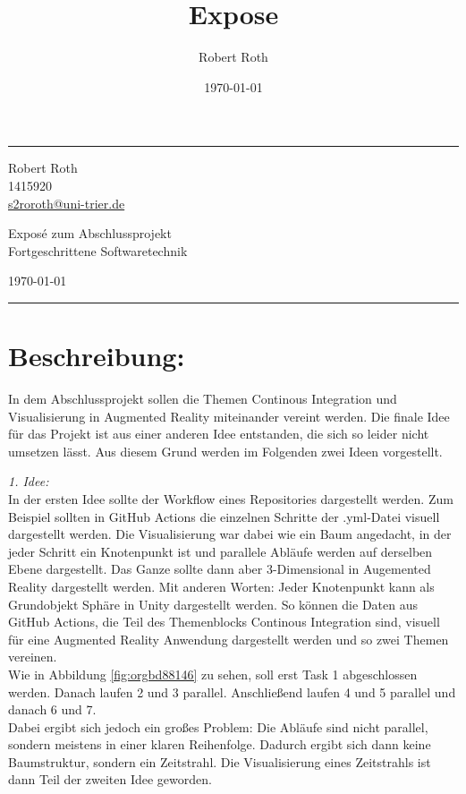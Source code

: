 \documentclass{article}
\author{Robert Roth}
\date{\today}
\title{Expose}
\makeatletter
\newcommand{\name}{Robert Roth}
\newcommand{\matrikelnr}{1415920}
\newcommand{\email}{s2roroth@uni-trier.de}
\newcommand{\titelname}{Exposé zum Abschlussprojekt}
\newcommand{\vorlesung}{Fortgeschrittene Softwaretechnik}
\makeatother
\begin{document}
\fancyhead[C]{}
\hrule \medskip %
\begin{minipage}{0.295\textwidth} 
\raggedright
\footnotesize
\name \hfill\\   
\matrikelnr\hfill\\
\href{mailto:\email}{\email} 
\end{minipage}
\begin{minipage}{0.4\textwidth} 
\centering 
\large 
\titelname\\ 
\normalsize 
\vorlesung\\ 
\end{minipage}
\begin{minipage}{0.295\textwidth} 
\raggedleft
\today\hfill\\
\end{minipage}
\medskip\hrule 
\bigskip
\section*{Beschreibung:}
\label{sec:org6aef6d6}
In dem Abschlussprojekt sollen die Themen Continous Integration und Visualisierung in Augmented Reality miteinander vereint werden. Die finale Idee für das Projekt ist aus einer anderen Idee entstanden, die sich so leider nicht umsetzen lässt. Aus diesem Grund werden im Folgenden zwei Ideen vorgestellt.

\emph{1. Idee:}\\[0pt]
In der ersten Idee sollte der Workflow eines Repositories dargestellt werden. Zum Beispiel sollten in GitHub Actions die einzelnen Schritte der .yml-Datei visuell dargestellt werden. Die Visualisierung war dabei wie ein Baum angedacht, in der jeder Schritt ein Knotenpunkt ist und parallele Abläufe werden auf derselben Ebene dargestellt. Das Ganze sollte dann aber 3-Dimensional in Augemented Reality dargestellt werden. Mit anderen Worten: Jeder Knotenpunkt kann als Grundobjekt Sphäre in Unity dargestellt werden. So können die Daten aus GitHub Actions, die Teil des Themenblocks Continous Integration sind, visuell für eine Augmented Reality Anwendung dargestellt werden und so zwei Themen vereinen.\\[0pt]
Wie in Abbildung \ref{fig:orgbd88146} zu sehen, soll erst Task 1 abgeschlossen werden. Danach laufen 2 und 3 parallel. Anschließend laufen 4 und 5 parallel und danach 6 und 7.\\[0pt]
Dabei ergibt sich jedoch ein großes Problem: Die Abläufe sind nicht parallel, sondern meistens in einer klaren Reihenfolge. Dadurch ergibt sich dann keine Baumstruktur, sondern ein Zeitstrahl. Die Visualisierung eines Zeitstrahls ist dann Teil der zweiten Idee geworden.
\end{document}
